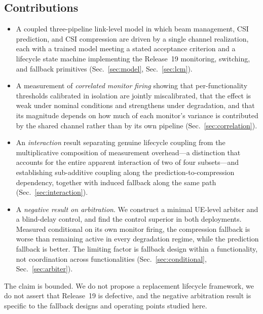 \subsection*{Contributions}

\begin{itemize}
  \item A coupled three-pipeline link-level model in which beam management,
  CSI prediction, and CSI compression are driven by a single channel
  realization, each with a trained model meeting a stated acceptance
  criterion and a lifecycle state machine implementing the Release~19
  monitoring, switching, and fallback primitives
  (Sec.~\ref{sec:model}, Sec.~\ref{sec:lcm}).

  \item A measurement of \emph{correlated monitor firing} showing that
  per-functionality thresholds calibrated in isolation are jointly
  miscalibrated, that the effect is weak under nominal conditions and
  strengthens under degradation, and that its magnitude depends on how much
  of each monitor's variance is contributed by the shared channel rather
  than by its own pipeline (Sec.~\ref{sec:correlation}).

  \item An \emph{interaction} result separating genuine lifecycle coupling
  from the multiplicative composition of measurement overhead---a
  distinction that accounts for the entire apparent interaction of two of
  four subsets---and establishing sub-additive coupling along the
  prediction-to-compression dependency, together with induced fallback
  along the same path (Sec.~\ref{sec:interaction}).

  \item A \emph{negative result on arbitration}. We construct a minimal
  UE-level arbiter and a blind-delay control, and find the control
  superior in both deployments. Measured conditional on its own monitor
  firing, the compression fallback is worse than remaining active in every
  degradation regime, while the prediction fallback is better. The limiting
  factor is fallback design within a functionality, not coordination
  across functionalities (Sec.~\ref{sec:conditional},
  Sec.~\ref{sec:arbiter}).
\end{itemize}

The claim is bounded. We do not propose a replacement lifecycle framework,
we do not assert that Release~19 is defective, and the negative arbitration
result is specific to the fallback designs and operating points studied
here.

